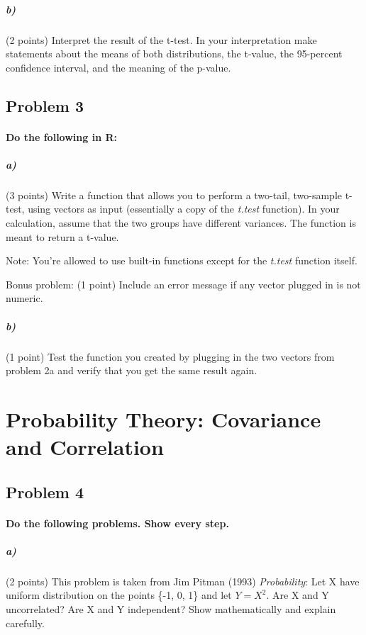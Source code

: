\documentclass[12pt,letter]{article}
\begin{document}
\subparagraph{b)} (2 points) Interpret the result of the t-test. In your interpretation make statements about the means of both distributions, the t-value, the 95-percent confidence interval, and the meaning of the p-value.



\subsection*{Problem 3}

\paragraph{Do the following in R:}

\subparagraph{a)} (3 points) Write a function that allows you to perform a two-tail, two-sample t-test, using vectors as input (essentially a copy of the \textit{t.test} function). In your calculation, assume that the two groups have different variances. The function is meant to return a t-value.

Note: You're allowed to use built-in functions except for the \textit{t.test} function itself.

\bigskip

Bonus problem: (1 point) Include an error message if any vector plugged in is not numeric.

\subparagraph{b)} (1 point) Test the function you created by plugging in the two vectors from problem 2a and verify that you get the same result again.





\section*{Probability Theory: Covariance and Correlation}

\subsection*{Problem 4}

\paragraph{Do the following problems. Show every step.}

\subparagraph{a)} (2 points) This problem is taken from Jim Pitman (1993) \textit{Probability}: Let X have uniform distribution on the points \big\{-1, 0, 1\big\} and let $Y=X^2$. Are X and Y uncorrelated? Are X and Y independent? Show mathematically and explain carefully. %
\end{document}
